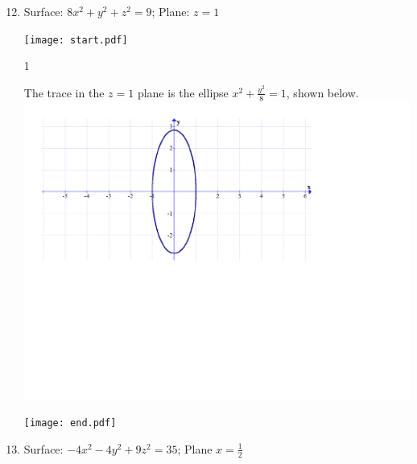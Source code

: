 \documentclass[12pt]{article}
\begin{document}
\begin{enumerate}
\begin{enumerate}
\end{enumerate}

\end{enumerate}


\begin{enumerate}
\setcounter{enumi}{11}

\item Surface: $8x^2+y^2+z^2=9$; Plane: $z=1$

\texttt{[image: start.pdf]}
{{{1\linewidth}{\begin{center}The trace in the $z=1$ plane is the ellipse $x^2+\frac{y^2}{8}=1$, shown below.\\
\includegraphics[scale=0.5]{trace1.pdf}
\end{center}}}}
\texttt{[image: end.pdf]}


\newpage

\item Surface: $-4x^2-4y^2+9z^2=35$; Plane $x=\frac{1}{2}$


\end{enumerate}
\end{document}
